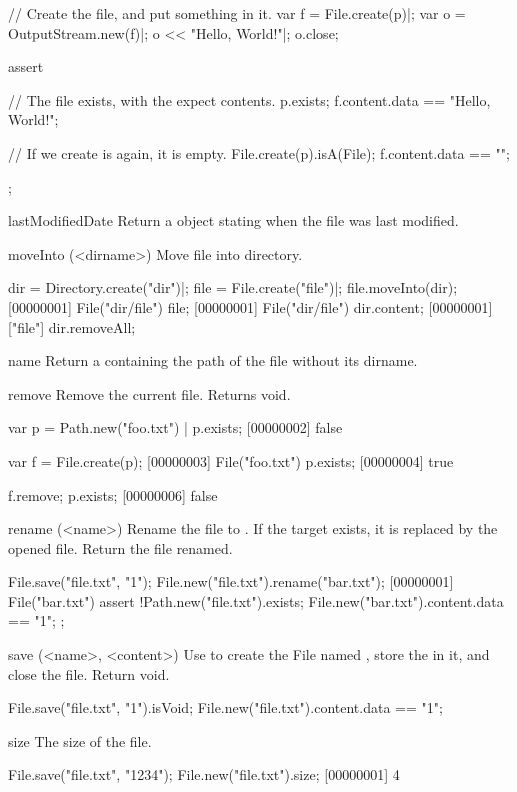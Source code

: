 \begin{urbiscriptapi}
\begin{urbiscript}
// Create the file, and put something in it.
var f = File.create(p)|;
var o = OutputStream.new(f)|;
o << "Hello, World!"|;
o.close;

assert
{
  // The file exists, with the expect contents.
  p.exists;
  f.content.data == "Hello, World!";

  // If we create is again, it is empty.
  File.create(p).isA(File);
  f.content.data == "";
};
\end{urbiscript}

\item[lastModifiedDate]
  Return a  object stating when the file was last modified.

\item[moveInto](<dirname>)
  Move file into  directory.
\begin{urbiscript}
dir = Directory.create("dir")|;
file = File.create("file")|;
file.moveInto(dir);
[00000001] File("dir/file")
file;
[00000001] File("dir/file")
dir.content;
[00000001] ["file"]
dir.removeAll;
\end{urbiscript}

\item[name]
  Return a  containing the path of the file without
  its dirname.

\item[remove]
  Remove the current file.  Returns void.
\begin{urbiscript}[firstnumber=1]
var p = Path.new("foo.txt") |
p.exists;
[00000002] false

var f = File.create(p);
[00000003] File("foo.txt")
p.exists;
[00000004] true

f.remove;
p.exists;
[00000006] false
\end{urbiscript}

\item[rename](<name>)%
  Rename the file to .  If the target exists, it is replaced by
  the opened file. Return the file renamed.
\begin{urbiscript}
File.save("file.txt", "1\n");
File.new("file.txt").rename("bar.txt");
[00000001] File("bar.txt")
assert
{
  !Path.new("file.txt").exists;
  File.new("bar.txt").content.data == "1\n";
};
\end{urbiscript}

\item[save](<name>, <content>)
  Use  to create the File named , store the
   in it, and close the file.  Return void.
\begin{urbiassert}
File.save("file.txt", "1\n").isVoid;
File.new("file.txt").content.data == "1\n";
\end{urbiassert}

\item[size]
  The size of the file.
\begin{urbiscript}
File.save("file.txt", "1234");
File.new("file.txt").size;
[00000001] 4
\end{urbiscript}
\end{urbiscriptapi}


